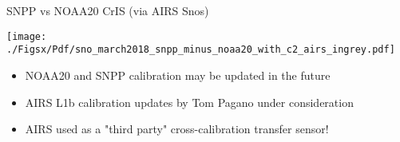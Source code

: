 \documentclass[10pt,t]{beamer}
\begin{document}
\begin{frame}[label={sec:org6aaf1ce}]{SNPP vs NOAA20 CrIS (via AIRS Snos)}
\vspace{-0.1in}

\begin{center}
\texttt{[image: ./Figsx/Pdf/sno\_march2018\_snpp\_minus\_noaa20\_with\_c2\_airs\_ingrey.pdf]}
\end{center}

\vspace{-0.1in}

\small
\begin{itemize}
\item NOAA20 and SNPP calibration may be updated in the future
\item AIRS L1b calibration updates by Tom Pagano under consideration
\item AIRS used as a "third party" cross-calibration transfer sensor!
\end{itemize}
\end{frame}
\end{document}

